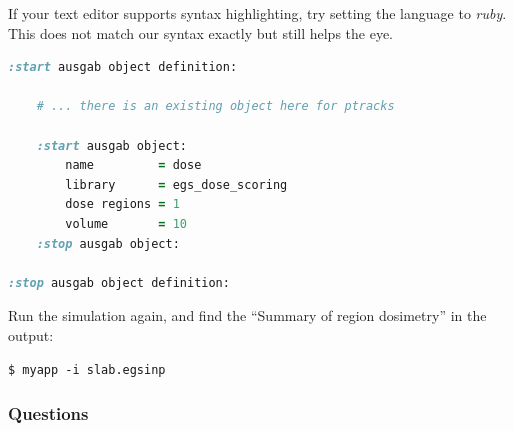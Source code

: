 \documentclass[12pt,twoside]{article}
\begin{document}
If your text editor supports syntax highlighting, try setting the language to \textit{ruby}. This does not match our syntax exactly but still helps the eye.

\begin{lstlisting}[language=ruby,backgroundcolor=\color{white}]
:start ausgab object definition:

    # ... there is an existing object here for ptracks

    :start ausgab object:
        name         = dose
        library      = egs_dose_scoring
        dose regions = 1
        volume       = 10
    :stop ausgab object:

:stop ausgab object definition:
\end{lstlisting}

Run the simulation again, and find the ``Summary of region
dosimetry'' in the output:
\begin{lstlisting}
$ myapp -i slab.egsinp
\end{lstlisting}

\subsubsection{Questions}
\end{document}
